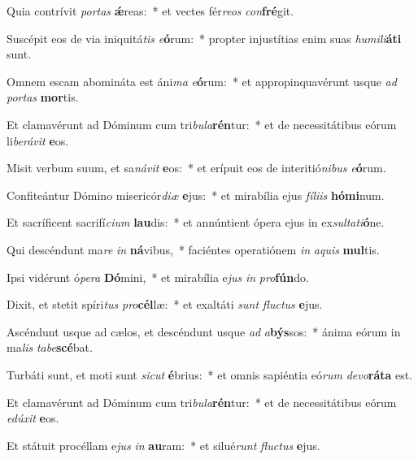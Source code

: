 \item Quia contrívit \textit{por}\textit{tas} \textbf{ǽ}reas:~* et vectes fér\textit{re}\textit{os} \textit{con}\textbf{fré}git.
\item Suscépit eos de via iniquitá\textit{tis} \textit{e}\textbf{ó}rum:~* propter injustítias enim suas \textit{hu}\textit{mi}\textit{li}\textbf{á}\textbf{ti} sunt.
\item Omnem escam abomináta est áni\textit{ma} \textit{e}\textbf{ó}rum:~* et appropinquavérunt usque \textit{ad} \textit{por}\textit{tas} \textbf{mor}tis.
\item Et clamavérunt ad Dóminum cum tri\textit{bu}\textit{la}\textbf{rén}tur:~* et de necessitátibus eórum li\textit{be}\textit{rá}\textit{vit} \textbf{e}os.
\item Misit verbum suum, et sa\textit{ná}\textit{vit} \textbf{e}os:~* et erípuit eos de interitió\textit{ni}\textit{bus} \textit{e}\textbf{ó}rum.
\item Confiteántur Dómino misericór\textit{di}\textit{æ} \textbf{e}jus:~* et mirabília ejus \textit{fí}\textit{li}\textit{is} \textbf{hó}\textbf{mi}num.
\item Et sacríficent sacrifí\textit{ci}\textit{um} \textbf{lau}dis:~* et annúntient ópera ejus in ex\textit{sul}\textit{ta}\textit{ti}\textbf{ó}ne.
\item Qui descéndunt ma\textit{re} \textit{in} \textbf{ná}vibus,~* faciéntes operatiónem \textit{in} \textit{a}\textit{quis} \textbf{mul}tis.
\item Ipsi vidérunt ó\textit{pe}\textit{ra} \textbf{Dó}mini,~* et mirabília e\textit{jus} \textit{in} \textit{pro}\textbf{fún}do.
\item Dixit, et stetit spíri\textit{tus} \textit{pro}\textbf{cél}læ:~* et exaltáti \textit{sunt} \textit{fluc}\textit{tus} \textbf{e}jus.
\item Ascéndunt usque ad cælos, et descéndunt usque \textit{ad} \textit{a}\textbf{býs}sos:~* ánima eórum in ma\textit{lis} \textit{ta}\textit{be}\textbf{scé}bat.
\item Turbáti sunt, et moti sunt \textit{sic}\textit{ut} \textbf{é}brius:~* et omnis sapiéntia eó\textit{rum} \textit{de}\textit{vo}\textbf{rá}\textbf{ta} est.
\item Et clamavérunt ad Dóminum cum tri\textit{bu}\textit{la}\textbf{rén}tur:~* et de necessitátibus eórum \textit{e}\textit{dú}\textit{xit} \textbf{e}os.
\item Et státuit procéllam e\textit{jus} \textit{in} \textbf{au}ram:~* et silué\textit{runt} \textit{fluc}\textit{tus} \textbf{e}jus.
